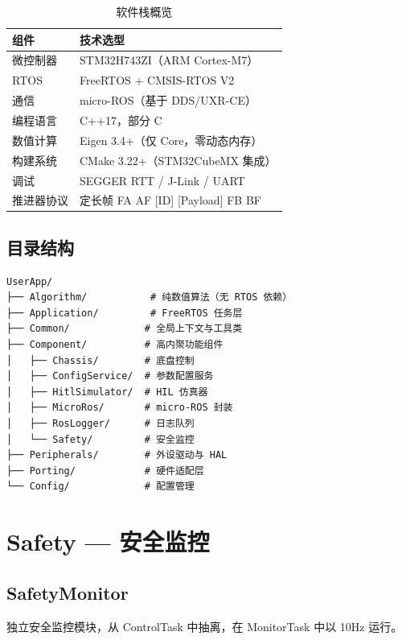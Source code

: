 \documentclass[12pt,a4paper]{article}
\begin{document}
\begin{table}[H]
\centering
\begin{tabularx}{\textwidth}{lX}
\toprule
\textbf{组件} & \textbf{技术选型} \\
\midrule
微控制器 & STM32H743ZI（ARM Cortex-M7） \\
RTOS & FreeRTOS + CMSIS-RTOS V2 \\
通信 & micro-ROS（基于 DDS/UXR-CE） \\
编程语言 & C++17，部分 C \\
数值计算 & Eigen 3.4+（仅 Core，零动态内存） \\
构建系统 & CMake 3.22+（STM32CubeMX 集成） \\
调试 & SEGGER RTT / J-Link / UART \\
推进器协议 & 定长帧 FA AF [ID] [Payload] FB BF \\
\bottomrule
\end{tabularx}
\caption{软件栈概览}
\end{table}

\subsection{目录结构}

\begin{lstlisting}[caption={项目顶层目录结构}]
UserApp/
├── Algorithm/           # 纯数值算法（无 RTOS 依赖）
├── Application/         # FreeRTOS 任务层
├── Common/             # 全局上下文与工具类
├── Component/          # 高内聚功能组件
│   ├── Chassis/        # 底盘控制
│   ├── ConfigService/  # 参数配置服务
│   ├── HitlSimulator/  # HIL 仿真器
│   ├── MicroRos/       # micro-ROS 封装
│   ├── RosLogger/      # 日志队列
│   └── Safety/         # 安全监控
├── Peripherals/        # 外设驱动与 HAL
├── Porting/            # 硬件适配层
└── Config/             # 配置管理
\end{lstlisting}

\section{Safety — 安全监控}

\subsection{SafetyMonitor}

独立安全监控模块，从 ControlTask 中抽离，在 MonitorTask 中以 10Hz 运行。
\end{document}
